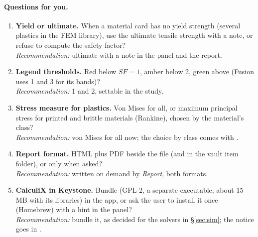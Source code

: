\paragraph{Questions for you.}
\begin{enumerate}[label=S\arabic*.]
  \item \textbf{Yield or ultimate.} When a material card has no yield strength (several plastics in the FEM
        library), use the ultimate tensile strength with a note, or refuse to compute the safety factor?\\
        \emph{Recommendation:} ultimate with a note in the panel and the report.
  \item \textbf{Legend thresholds.} Red below $SF=1$, amber below $2$, green above (Fusion uses 1 and 3 for its
        bands)?\\
        \emph{Recommendation:} 1 and 2, settable in the study.
  \item \textbf{Stress measure for plastics.} Von Mises for all, or maximum principal stress for printed and
        brittle materials (Rankine), chosen by the material's class?\\
        \emph{Recommendation:} von Mises for all now; the choice by class comes with .
  \item \textbf{Report format.} HTML plus PDF beside the file (and in the vault item folder), or only when asked?\\
        \emph{Recommendation:} written on demand by \emph{Report}, both formats.
  \item \textbf{CalculiX in Keystone.} Bundle  (GPL-2, a separate executable, about 15\,MB with its
        libraries) in the app, or ask the user to install it once (Homebrew) with a hint in the panel?\\
        \emph{Recommendation:} bundle it, as decided for the solvers in \S\ref{sec:sim}; the notice goes in
        .
\end{enumerate}

